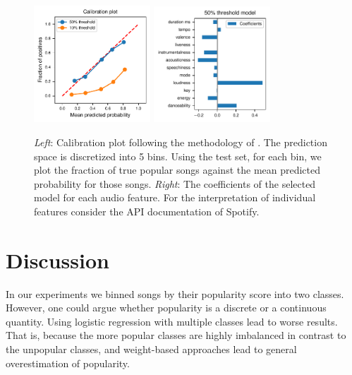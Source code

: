 \documentclass{article}
\begin{document}
\begin{figure}
  \centering
  \includegraphics[width=0.39\textwidth]{../figures/calibration_combined.pdf}
  \qquad
  \includegraphics[width=0.39\textwidth]{../figures/logistic_coefs_50_threshold_model.pdf}
  \caption{\textit{Left}: Calibration plot following the methodology of \cite{niculescu-mizilPredictingGoodProbabilities2005}. The prediction space is discretized into 5 bins. Using the test set, for each bin, we plot the fraction of true popular songs against the mean predicted probability for those songs. \textit{Right}: The coefficients of the selected model for each audio feature. For the interpretation of individual features consider the API documentation of Spotify.}
  \label{fig:logis_eval}
\end{figure}

  

\section{Discussion}


In our experiments we binned songs by their popularity score into two classes. However, one could argue whether popularity is a discrete or a continuous quantity. Using logistic regression with multiple classes lead to worse results. That is, because the more popular classes are highly imbalanced in contrast to the unpopular classes, and weight-based approaches lead to general overestimation of popularity.
\end{document}
